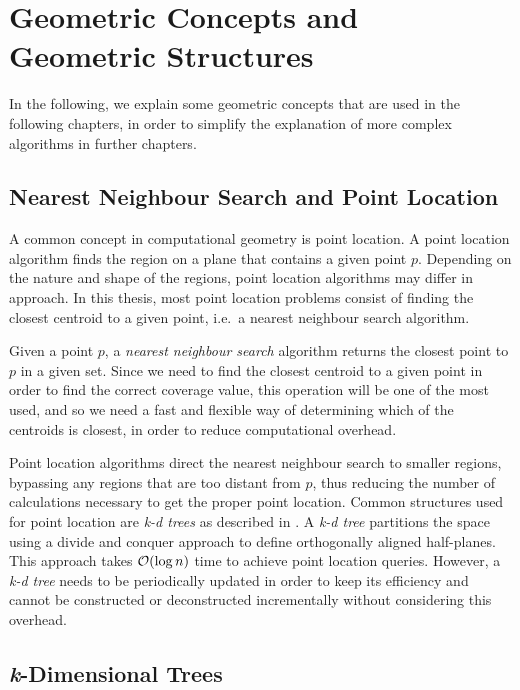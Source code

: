 \section{Geometric Concepts and Geometric Structures}
In the following, we explain some geometric concepts that are used in the following chapters, in order to simplify the explanation of more complex algorithms in further chapters.
\subsection{Nearest Neighbour Search and Point Location}
A common concept in computational geometry is point location. A point location algorithm finds the region on a plane that contains a given point $p$. Depending on the nature and shape of the regions, point location algorithms may differ in approach. In this thesis, most point location problems consist of finding the closest centroid to a given point, i.e.\ a nearest neighbour search algorithm.

Given a point $p$, a \emph{nearest neighbour search} algorithm returns the closest point to $p$ in a given set. Since we need to find the closest centroid to a given point in order to find the correct coverage value, this operation will be one of the most used, and  so we need a fast and flexible way of determining which of the centroids is closest, in order to reduce computational overhead. 

Point location algorithms direct the nearest neighbour search to smaller regions, bypassing any regions that are too distant from $p$, thus reducing the number of calculations necessary to get the proper point location.
Common structures used for point location are \emph{k-d trees} as described in \citet{incrementalcov}. A \emph{k-d tree} partitions the space using a divide and conquer approach to define orthogonally aligned half-planes. This approach takes $\mathcal{O}(\log{n})$ time to achieve point location queries. However, a \emph{k-d tree} needs to be periodically updated in order to keep its efficiency and cannot be constructed or deconstructed incrementally without considering this overhead.

\subsection{\textit{k}-Dimensional Trees}

